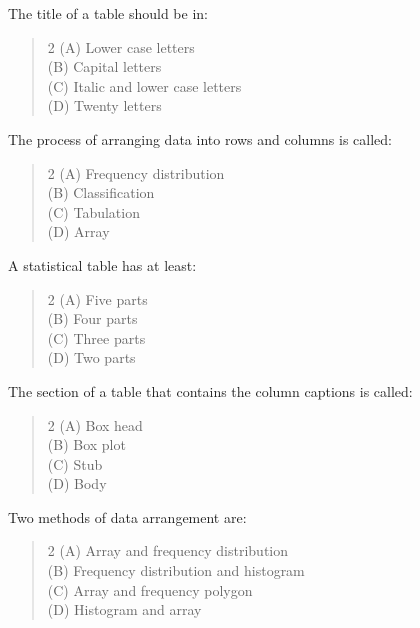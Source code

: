 \documentclass[11pt,a4paper]{article}
\begin{document}
\begin{mcqlist}
\item The title of a table should be in:
\begin{quote}\begin{multicols}{2}
\noindent (A) Lower case letters \\
(B) Capital letters \\
(C) Italic and lower case letters \\
(D) Twenty letters
\end{multicols}\end{quote}

\item The process of arranging data into rows and columns is called:
\begin{quote}\begin{multicols}{2}
\noindent (A) Frequency distribution \\
(B) Classification \\
(C) Tabulation \\
(D) Array
\end{multicols}\end{quote}

\item A statistical table has at least:
\begin{quote}\begin{multicols}{2}
\noindent (A) Five parts \\
(B) Four parts \\
(C) Three parts \\
(D) Two parts
\end{multicols}\end{quote}

\item The section of a table that contains the column captions is called:
\begin{quote}\begin{multicols}{2}
\noindent (A) Box head \\
(B) Box plot \\
(C) Stub \\
(D) Body
\end{multicols}\end{quote}

\item Two methods of data arrangement are:
\begin{quote}\begin{multicols}{2}
\noindent (A) Array and frequency distribution \\
(B) Frequency distribution and histogram \\
(C) Array and frequency polygon \\
(D) Histogram and array
\end{multicols}\end{quote}


\end{mcqlist}
\end{document}
